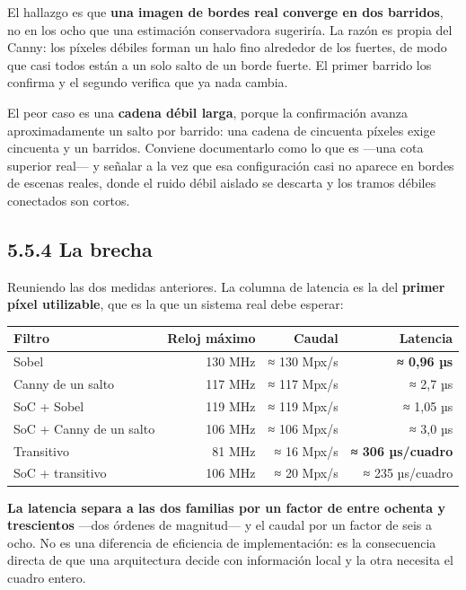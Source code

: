 El hallazgo es que \textbf{una imagen de bordes real converge en dos
barridos}, no en los ocho que una estimación conservadora sugeriría. La
razón es propia del Canny: los píxeles débiles forman un halo fino
alrededor de los fuertes, de modo que casi todos están a un solo salto
de un borde fuerte. El primer barrido los confirma y el segundo verifica
que ya nada cambia.

El peor caso es una \textbf{cadena débil larga}, porque la confirmación
avanza aproximadamente un salto por barrido: una cadena de cincuenta
píxeles exige cincuenta y un barridos. Conviene documentarlo como lo que
es ---una cota superior real--- y señalar a la vez que esa configuración
casi no aparece en bordes de escenas reales, donde el ruido débil
aislado se descarta y los tramos débiles conectados son cortos.

\subsection{5.5.4 La brecha}\label{la-brecha}

Reuniendo las dos medidas anteriores. La columna de latencia es la del
\textbf{primer píxel utilizable}, que es la que un sistema real debe
esperar:

\begin{longtable}[]{@{}lrrr@{}}
\toprule\noalign{}
Filtro & Reloj máximo & Caudal & Latencia \\
\midrule\noalign{}
\endhead
\bottomrule\noalign{}
\endlastfoot
Sobel & 130 MHz & ≈ 130 Mpx/s & \textbf{≈ 0,96 µs} \\
Canny de un salto & 117 MHz & ≈ 117 Mpx/s & ≈ 2,7 µs \\
SoC + Sobel & 119 MHz & ≈ 119 Mpx/s & ≈ 1,05 µs \\
SoC + Canny de un salto & 106 MHz & ≈ 106 Mpx/s & ≈ 3,0 µs \\
Transitivo & 81 MHz & ≈ 16 Mpx/s & \textbf{≈ 306 µs/cuadro} \\
SoC + transitivo & 106 MHz & ≈ 20 Mpx/s & ≈ 235 µs/cuadro \\
\end{longtable}

\textbf{La latencia separa a las dos familias por un factor de entre
ochenta y trescientos} ---dos órdenes de magnitud--- y el caudal por un
factor de seis a ocho. No es una diferencia de eficiencia de
implementación: es la consecuencia directa de que una arquitectura
decide con información local y la otra necesita el cuadro entero.

